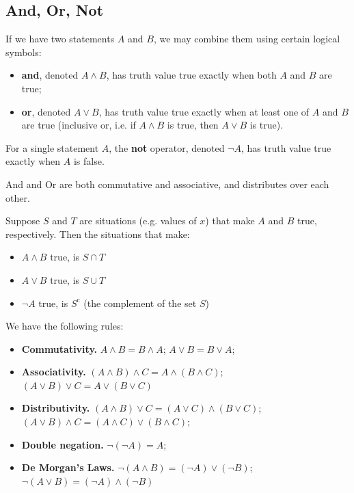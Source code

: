 \documentclass[11pt]{article}
\theoremstyle{definition}
\theoremstyle{remark}
\newcommand{\pqty}[1]{\left(#1\right)}
\newcommand{\compl}{^{\mathrm{c}}}
\begin{document}
\subsection{And, Or, Not}\label{tmua-6-subsection-002}

If we have two statements \(A\) and \(B\), we may combine them using certain logical symbols:
\begin{itemize}
    \item \textbf{and}, denoted \(A \land B\), has truth value true exactly when both \(A\) and \(B\) are true;
    \item \textbf{or}, denoted \(A \lor B\), has truth value true exactly when at least one of \(A\) and \(B\) are true (inclusive or, i.e. if \(A \land B\) is true, then \(A \lor B\) is true).
\end{itemize}

For a single statement \(A\), the \textbf{not} operator, denoted \(\lnot A\), has truth value true exactly when \(A\) is false.

And and Or are both commutative and associative, and distributes over each other.

Suppose \(S\) and \(T\) are situations (e.g. values of \(x\)) that make \(A\) and \(B\) true, respectively. Then the situations that make:
\begin{itemize}
    \item \(A \land B\) true, is \(S \cap T\)
    \item \(A \lor B\) true, is \(S \cup T\)
    \item \(\lnot A\) true, is \(S\compl\) (the complement of the set \(S\))
\end{itemize}

We have the following rules:
\begin{itemize}
    \item \textbf{Commutativity.} \(A \land B = B \land A\); \(A \lor B = B \lor A\);
    \item \textbf{Associativity.} \(\pqty{A \land B} \land C = A \land \pqty{B \land C}\); \(\pqty{A \lor B} \lor C = A \lor \pqty{B \lor C}\)
    \item \textbf{Distributivity.} \(\pqty{A \land B} \lor C = \pqty{A \lor C} \land \pqty{B \lor C}\); \(\pqty{A \lor B} \land C = \pqty{A \land C} \lor \pqty{B \land C}\);
    \item \textbf{Double negation.} \(\lnot \pqty{\lnot A} = A\);
    \item \textbf{De Morgan's Laws.} \(\lnot \pqty{A \land B} = \pqty{\lnot A} \lor \pqty{\lnot B}\); \(\lnot \pqty{A \lor B} = \pqty{\lnot A} \land \pqty{\lnot B}\)
\end{itemize}
\end{document}
